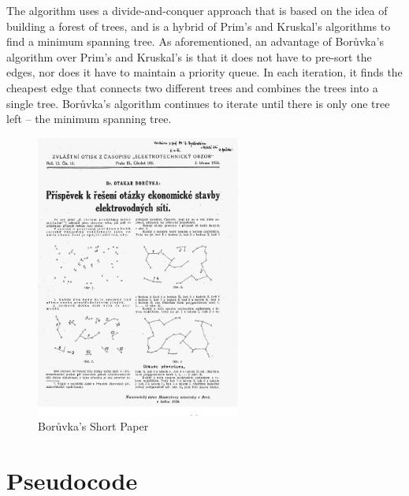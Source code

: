 \documentclass[a4paper, 11pt]{article}
\begin{document}
The algorithm uses a divide-and-conquer approach that is based on the idea of building a forest of trees, and is a hybrid of Prim's and Kruskal's algorithms to find a minimum spanning tree. As aforementioned, an advantage of Borůvka's algorithm over Prim's and Kruskal's is that it does not have to pre-sort the edges, nor does it have to maintain a priority queue. In each iteration, it finds the cheapest edge that connects two different trees and combines the trees into a single tree. Borůvka's algorithm continues to iterate until there is only one tree left -- the minimum spanning tree.

\begin{figure}[h]
    \caption{Borůvka's Short Paper \cite{nevsetvril2001otakar}}
    \begin{center}
        \includegraphics[width=0.6\textwidth]{Boruvka's Short Paper.png}
    \end{center}
\end{figure}

\section{Pseudocode}
\end{document}
